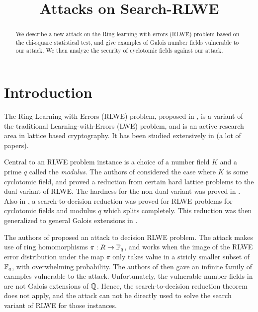 \documentclass[envcountsect]{llncs}
\title{Attacks on Search-RLWE}
\begin{document}
\maketitle

\begin{abstract}
We describe a new attack on the Ring learning-with-errors (RLWE) problem based on the chi-square statistical test, and give examples of Galois number fields vulnerable to our attack. We then analyze the security of cyclotomic fields against our attack.

\end{abstract}

\section{Introduction}
The Ring Learning-with-Errors (RLWE) problem, proposed in \cite{lyubashevsky2013ideal}, is a variant of the traditional Learning-with-Errors (LWE) problem, and is an active research area in lattice based cryptography. It has been studied extensively in (a lot of papers).

Central to an RLWE problem instance is a choice of a number field $K$ and a prime $q$ called the {\it modulus}. The authors of \cite{lyubashevsky2013ideal} considered the case where $K$ is some cyclotomic field, and proved a reduction from certain hard lattice problems to the dual variant of RLWE. The hardness for the non-dual variant was proved in \cite{ducas2012ring}. Also in \cite{lyubashevsky2013ideal}, a search-to-decision reduction was proved for RLWE problems for cyclotomic fields and modulus $q$ which splits completely. This reduction was then generalized to general Galois extensions in \cite{eisentrager2014weak}.

The authors of \cite{elos2015weak} proposed an attack to decision RLWE problem. The attack makes use of ring homomorphisms $\pi: R \to \mathbb{F}_q$, and works when the image of the RLWE error distribution under the map $\pi$ only takes value in a stricly smaller subset of $\mathbb{F}_q$, with overwhelming probability. The authors of \cite{elos2015weak} then gave an infinite family of examples vulnerable to the attack. Unfortunately, the vulnerable number fields in \cite{elos2015weak} are not Galois extensions of $\mathbb{Q}$. Hence, the search-to-decision reduction theorem does not apply, and the attack can not be directly used to solve the search variant of RLWE for those instances.
\end{document}
